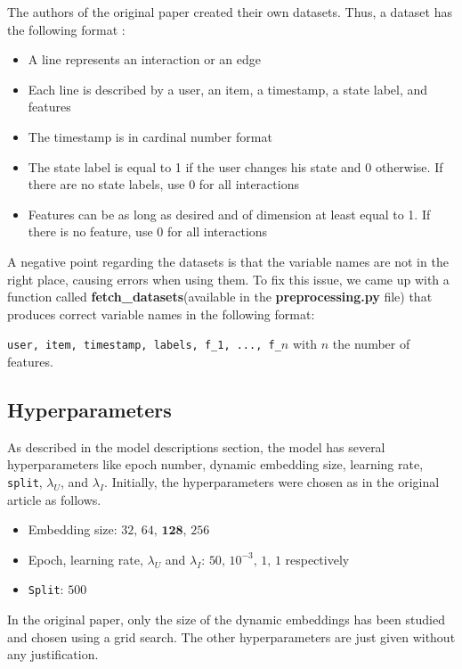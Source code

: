 The authors of the original paper created their own datasets. Thus, a dataset has the following format :
\begin{itemize}
    \item A line represents an interaction or an edge
    \item Each line is described by a user, an item, a timestamp, a state label, and features
    \item The timestamp is in cardinal number format
    \item The state label is equal to 1 if the user changes his state and 0 otherwise. If there are no state labels, use 0 for all interactions
    \item Features can be as long as desired and of dimension at least equal to 1. If there is no feature, use 0 for all interactions
\end{itemize}

A negative point regarding the datasets is that the variable names are not in the right place, causing errors when using them. To fix this issue, we came up with a function called \textbf{fetch\_datasets}(available in the \textbf{preprocessing.py} file) that produces correct variable names in the following format:

\texttt{user, item, timestamp, labels, f\_1, ..., f\_$n$} with $n$ the number of features.\\

\subsection{Hyperparameters}

As described in the model descriptions section, the model has several hyperparameters like epoch number, dynamic embedding size, learning rate, \texttt{split}, $\lambda_U$, and $\lambda_I$. Initially, the hyperparameters were chosen as in the original article as follows.

\begin{itemize}
    \item Embedding size: $32, \, 64, \, \textbf{128}, \, 256$
    \item Epoch, learning rate, $\lambda_U$ and $\lambda_I$: $50, \, 10^{-3}, \, 1, \, 1$ respectively
    \item \texttt{Split}: $500$
\end{itemize}

In the original paper, only the size of the dynamic embeddings has
been studied and chosen using a grid search. The other hyperparameters are just given without any justification.

